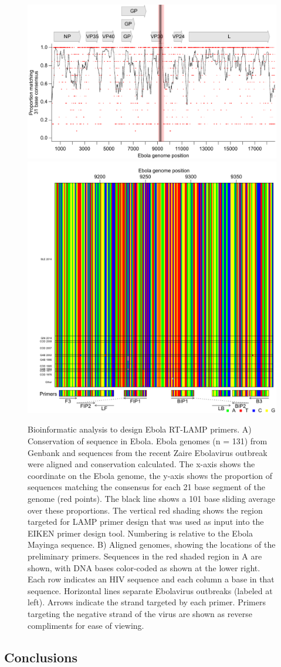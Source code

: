 \documentclass[../sherrill-Mix_thesis.tex]{subfiles}
\begin{document}
	\begin{figure}
		\centering
		\includegraphics[width=.6\textwidth]{ebolaConsensus.pdf} %
		\includegraphics[width=.6\textwidth]{loop_bases.pdf} %
		\caption[Ebola RT-LAMP primers design]{Bioinformatic analysis to design Ebola RT-LAMP primers. A) Conservation of sequence in Ebola. Ebola genomes (n = 131) from Genbank and sequences from the recent Zaire Ebolavirus outbreak \citep{Gire2014} were aligned and conservation calculated. The x-axis shows the coordinate on the Ebola genome, the y-axis shows the proportion of sequences matching the consensus for each 21 base segment of the genome (red points). The black line shows a 101 base sliding average over these proportions. The vertical red shading shows the region targeted for LAMP primer design that was used as input into the EIKEN primer design tool. Numbering is relative to the Ebola Mayinga sequence. B) Aligned genomes, showing the locations of the preliminary primers. Sequences in the red shaded region in A are shown, with DNA bases color-coded as shown at the lower right. Each row indicates an HIV sequence and each column a base in that sequence. Horizontal lines separate Ebolavirus outbreaks (labeled at left). Arrows indicate the strand targeted by each primer. Primers targeting the negative strand of the virus are shown as reverse compliments for ease of viewing.}
		\label{figEbolaConsensus}
	\end{figure}

\subsection{Conclusions}
\end{document}
